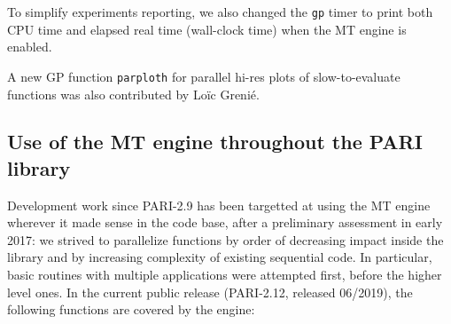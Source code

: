 \documentclass{deliverablereport}
\begin{document}
To simplify experiments reporting, we also changed the \texttt{gp} timer to
print both CPU time and elapsed real time (wall-clock time) when the MT
engine is enabled.

A new GP function \texttt{parploth} for parallel hi-res plots of
slow-to-evaluate functions was also contributed by Lo\"ic Greni\'e.

\subsection{Use of the MT engine throughout the PARI library}
Development work since PARI-2.9 has been targetted at using the MT engine
wherever it made sense in the \Pari code base, after a preliminary assessment
in early 2017: we strived to parallelize functions by order of decreasing
impact inside the \Pari library and by increasing complexity of existing
sequential code. In particular, basic routines with multiple applications
were attempted first, before the higher level ones. In the current public
release (PARI-2.12, released 06/2019), the following functions are covered by
the engine:
\end{document}
